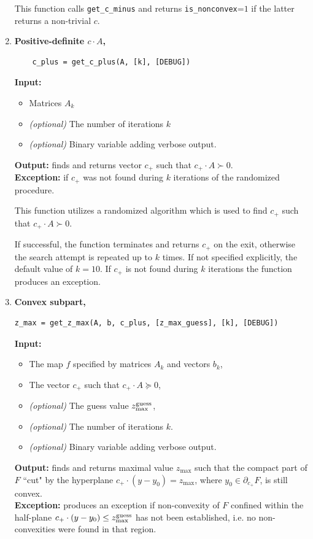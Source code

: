 \documentclass[a4paper]{article}
\theoremstyle{definition}
\begin{document}
\begin{enumerate}
	
This function calls {\tt get\_c\_minus} and returns  {\tt is\_nonconvex}=$1$ if the latter returns a non-trivial $c$. 


\item {\bf Positive-definite $c\cdot A$,\hskip 6pt}
\begin{verbatim}
	c_plus = get_c_plus(A, [k], [DEBUG])
\end{verbatim}

{\bf Input:}
\begin{itemize}
	\item Matrices $A_k$
	\item {\it (optional)} The number of iterations $k$
	\item {\it (optional)} Binary variable adding verbose output.
\end{itemize}
{\bf Output:} finds and returns vector $c_+$ such that $c_+\cdot A\succ 0$.\\
{\bf Exception:} if $c_+$  was not found during $k$ iterations of the randomized procedure.
	
This function utilizes a randomized algorithm which is used to find $c_+$ such that $c_+\cdot A\succ 0$.

If successful, the function terminates and returns $c_+$ on the exit, otherwise the search attempt is repeated up to $k$ times.
If not specified explicitly, the default value of $k=10$.
If $c_+$ is not found during $k$ iterations the function produces an exception. 

\newpage
	
\item {\bf Convex subpart,\hskip 6pt}
\begin{verbatim}
z_max = get_z_max(A, b, c_plus, [z_max_guess], [k], [DEBUG])
\end{verbatim}
{\bf Input:}
\begin{itemize}
	\item The map $f$ specified by matrices $A_k$ and vectors $b_k$,
	\item The vector $c_+$ such that $c_+\cdot A\succeq 0$,
	\item {\it (optional)} The guess value  $z^{\rm guess}_{\rm max}$,
	\item {\it (optional)} The number of iterations $k$.
	\item {\it (optional)} Binary variable adding verbose output.
\end{itemize}
{\bf Output:} finds and returns maximal value $z_{\max}$ such that the compact part of $F$ ``cut" by the hyperplane  $c_+ \cdot (y-y_0)=z_{\max}$, where $y_0\in \partial_{c_+}F$, is still convex. \\
{\bf Exception:} produces an exception if non-convexity of $F$ confined within the half-plane $c_+ \cdot (y-y_0)\leq z^{\rm guess}_{\rm max}$  has not been established, i.e. no non-convexities were found in that region.


\end{enumerate}
\end{document}
